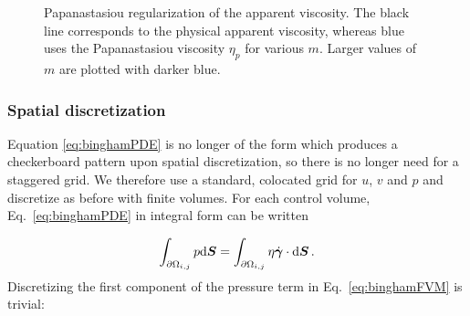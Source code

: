 \documentclass[final,3p,twocolumn]{elsarticle}
\begin{document}
\begin{figure}[htb]
    \centering
    \caption
    {
        Papanastasiou regularization of the apparent viscosity. The black line
        corresponds to the physical apparent viscosity, whereas blue uses the
        Papanastasiou viscosity $\eta_p$ for various $m$.  Larger values of $m$
        are plotted with darker blue. 
    }
    \label{fig:regularization}
\end{figure}

\subsubsection{Spatial discretization}

Equation \eqref{eq:binghamPDE} is no longer of the form which produces a
checkerboard pattern upon spatial discretization, so there is no longer need
for a staggered grid. We therefore use a standard, colocated grid for $u$, $v$
and $p$ and discretize as before with finite volumes. For each control volume,
Eq.\ \eqref{eq:binghamPDE} in integral form can be written

\begin{equation}
    \int_{\partial \Omega_{i,j}} p {\rm d}\bm{S} = \int_{\partial \Omega_{i,j}}
    \eta \dot{\bm{\gamma}} \cdot {\rm d}\bm{S} \,.
    \label{eq:binghamFVM}
\end{equation}
%
Discretizing the first component of the pressure term in Eq.\
\eqref{eq:binghamFVM} is trivial: 
\end{document}
